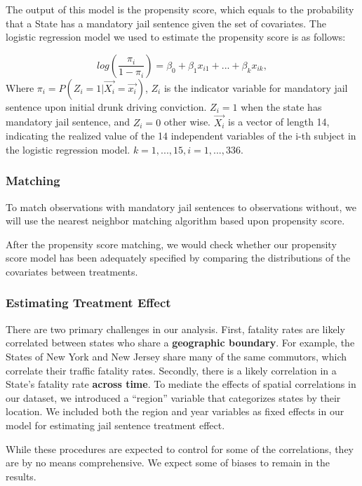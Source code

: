 \documentclass[]{article}
\begin{document}
The output of this model is the propensity score, which equals to the probability that a State has a mandatory jail sentence given the set of covariates. The logistic regression model we used to estimate the propensity score is as follows:

\[
log(\frac{\pi_i}{1-\pi_i}) = \beta_0 + \beta_1x_{i1} + ... + \beta_kx_{ik}, 
\]
Where \(\pi_i = P(Z_i = 1 | \overrightarrow{X_i} = \overrightarrow{x_i})\), \(Z_i\) is the indicator variable for mandatory jail sentence upon initial drunk driving conviction. \(Z_i = 1\) when the state has mandatory jail sentence, and \(Z_i = 0\) other wise. \(\overrightarrow{X_i}\) is a vector of length 14, indicating the realized value of the 14 independent variables of the i-th subject in the logistic regression model. \(k = 1, ..., 15, i = 1,...,336\).

\hypertarget{matching}{%
\subsubsection{Matching}\label{matching}}

To match observations with mandatory jail sentences to observations without, we will use the nearest neighbor matching algorithm based upon propensity score.

After the propensity score matching, we would check whether our propensity score model has been adequately specified by comparing the distributions of the covariates between treatments.

\hypertarget{estimating-treatment-effect}{%
\subsubsection{Estimating Treatment Effect}\label{estimating-treatment-effect}}

There are two primary challenges in our analysis. First, fatality rates are likely correlated between states who share a \textbf{geographic boundary}. For example, the States of New York and New Jersey share many of the same commutors, which correlate their traffic fatality rates. Secondly, there is a likely correlation in a State's fatality rate \textbf{across time}. To mediate the effects of spatial correlations in our dataset, we introduced a ``region'' variable that categorizes states by their location. We included both the region and year variables as fixed effects in our model for estimating jail sentence treatment effect.

While these procedures are expected to control for some of the correlations, they are by no means comprehensive. We expect some of biases to remain in the results.
\end{document}
